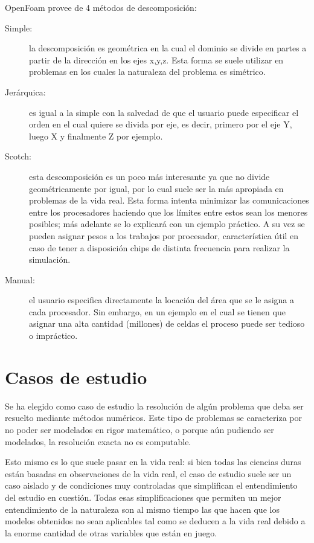 \documentclass{article}
\begin{document}
\begin{description}
        OpenFoam provee de 4 métodos de descomposición:
        \begin{description}
            \item [Simple:] la descomposición es geométrica en la cual el dominio se divide en partes a partir de la dirección en los ejes x,y,z. Esta forma se suele utilizar en problemas en los cuales la naturaleza del problema es simétrico.
            \item [Jerárquica:] es igual a la simple con la salvedad de que el usuario puede especificar el orden en el cual quiere se divida por eje, es decir, primero por el eje Y, luego X y finalmente Z por ejemplo.
            \item [Scotch:] esta descomposición es un poco más interesante ya que no divide geométricamente por igual, por lo cual suele ser la más apropiada en problemas de la vida real. Esta forma intenta minimizar las comunicaciones entre los procesadores haciendo que los límites entre estos sean los menores posibles; más adelante se lo explicará con un ejemplo práctico. A su vez se pueden asignar pesos a los trabajos por procesador, característica útil en caso de tener a disposición chips de distinta frecuencia para realizar la simulación.
            \item [Manual:] el usuario especifica directamente la locación del área que se le asigna a cada procesador. Sin embargo, en un ejemplo en el cual se tienen que asignar una alta cantidad (millones) de celdas el proceso puede ser tedioso o impráctico.
        \end{description}

\end{description}

\newpage
\section{Casos de estudio}
Se ha elegido como caso de estudio la resolución de algún problema que deba ser resuelto mediante métodos numéricos. Este tipo de problemas se caracteriza por no poder ser modelados en rigor matemático, o porque aún pudiendo ser modelados, la resolución exacta no es computable. 

Esto mismo es lo que suele pasar en la vida real: si bien todas las ciencias duras están basadas en observaciones de la vida real, el caso de estudio suele ser un caso aislado y de condiciones muy controladas que simplifican el entendimiento del estudio en cuestión. Todas esas simplificaciones que permiten un mejor entendimiento de la naturaleza son al mismo tiempo las que hacen que los modelos obtenidos no sean aplicables tal como se deducen a la vida real debido a la enorme cantidad de otras variables que están en juego.
\end{document}
